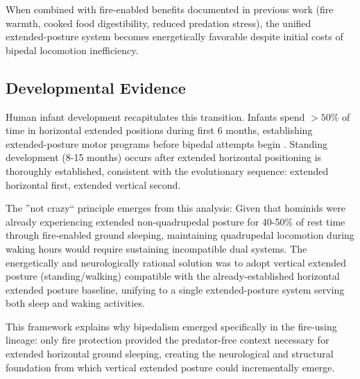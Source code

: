 When combined with fire-enabled benefits documented in previous work (fire warmth, cooked food digestibility, reduced predation stress), the unified extended-posture system becomes energetically favorable despite initial costs of bipedal locomotion inefficiency.

\subsection{Developmental Evidence}

Human infant development recapitulates this transition. Infants spend $>50\%$ of time in horizontal extended positions during first 6 months, establishing extended-posture motor programs before bipedal attempts begin \citep{adolph2000specificity}. Standing development (8-15 months) occurs after extended horizontal positioning is thoroughly established, consistent with the evolutionary sequence: extended horizontal first, extended vertical second.

The ''not crazy`` principle emerges from this analysis: Given that hominids were already experiencing extended non-quadrupedal posture for 40-50\% of rest time through fire-enabled ground sleeping, maintaining quadrupedal locomotion during waking hours would require sustaining incompatible dual systems. The energetically and neurologically rational solution was to adopt vertical extended posture (standing/walking) compatible with the already-established horizontal extended posture baseline, unifying to a single extended-posture system serving both sleep and waking activities.

This framework explains why bipedalism emerged specifically in the fire-using lineage: only fire protection provided the predator-free context necessary for extended horizontal ground sleeping, creating the neurological and structural foundation from which vertical extended posture could incrementally emerge.
